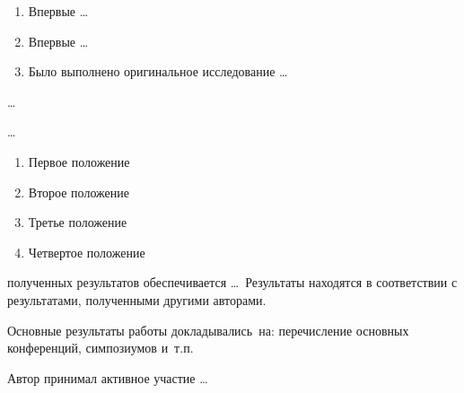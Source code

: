 {\novelty}
\begin{enumerate}[beginpenalty=10000] %
	\item Впервые \ldots
	\item Впервые \ldots
	\item Было выполнено оригинальное исследование \ldots
\end{enumerate}

{\influence} \ldots

{\methods} \ldots

{}
\begin{enumerate}[beginpenalty=10000] %
	\item Первое положение
	\item Второе положение
	\item Третье положение
	\item Четвертое положение
\end{enumerate}

{\reliability} полученных результатов обеспечивается \ldots \ Результаты находятся в соответствии с результатами, полученными другими авторами.


{\probation}
Основные результаты работы докладывались~на:
перечисление основных конференций, симпозиумов и~т.\:п.

{\contribution} Автор принимал активное участие \ldots

